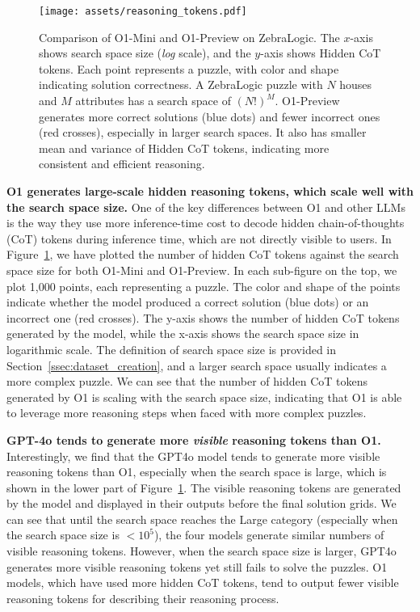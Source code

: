 \begin{figure}[h]
    \centering
    \texttt{[image: assets/reasoning\_tokens.pdf]}
    \vspace{-1mm}
    \caption{
    Comparison of O1-Mini and O1-Preview on ZebraLogic. The $x$-axis shows search space size (\textit{log} scale), and the $y$-axis shows Hidden CoT tokens. 
    Each point represents a puzzle, with color and shape indicating solution correctness. 
    A ZebraLogic puzzle with $N$ houses and $M$ attributes has a search space of $(N!)^M$.
    O1-Preview generates more correct solutions (blue dots) and fewer incorrect ones (red crosses), especially in larger search spaces. It also has smaller mean and variance of Hidden CoT tokens, indicating more consistent and efficient reasoning.
    }
    \label{fig:o1_hidden_cot}
\end{figure}


\textbf{O1 generates large-scale hidden reasoning tokens, which scale well with the search space size.}
One of the key differences between O1 and other LLMs is the way they use more inference-time cost to decode hidden chain-of-thoughts (CoT) tokens during inference time, which are not directly visible to users.
In Figure~\ref{fig:o1_hidden_cot}, we have plotted the number of hidden CoT tokens against the search space size for both O1-Mini and O1-Preview. 
In each sub-figure on the top, we plot 1,000 points, each representing a puzzle. 
The color and shape of the points indicate whether the model produced a correct solution (blue dots) or an incorrect one (red crosses).
The y-axis shows the number of hidden CoT tokens generated by the model, while the x-axis shows the search space size in logarithmic scale. The definition of search space size is provided in Section~\ref{ssec:dataset_creation}, and a larger search space usually indicates a more complex puzzle. 
We can see that the number of hidden CoT tokens generated by O1 is scaling with the search space size, indicating that O1 is able to leverage more reasoning steps when faced with more complex puzzles. 


\textbf{GPT-4o tends to generate more \textit{visible} reasoning tokens than O1.}
Interestingly, we find that the GPT4o model tends to generate more visible reasoning tokens than O1, especially when the search space is large, which is shown in the lower part of Figure~\ref{fig:o1_hidden_cot}.
The visible reasoning tokens are generated by the model and displayed in their outputs before the final solution grids.
We can see that until the search space reaches the Large category (especially when the search space size is $<10^5$), the four models generate similar numbers of visible reasoning tokens. However, when the search space size is larger, GPT4o generates more visible reasoning tokens yet still fails to solve the puzzles.
O1 models, which have used more hidden CoT tokens, tend to output fewer visible reasoning tokens for describing their reasoning process.



